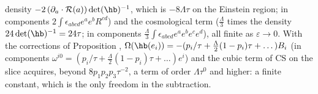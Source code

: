 density $-2\,(\partial_a\cdot\mathcal{R}(a))\det(\hb)^{-1}$, which is $-8\Lambda\tau$ on the Einstein region; in components $2\int\epsilon_{abcd}e^ae^bR^{cd}$) and the cosmological term ($\tfrac{\Lambda}{3}$ times the density $24\det(\hb)^{-1} = 24\tau$; in components $\tfrac{\Lambda}{3}\int\epsilon_{abcd}e^ae^be^ce^d$), all finite as $\varepsilon\to 0$. With the corrections of Proposition , $\Omega(\hb(e_i)) = -(p_i/\tau + \tfrac{\Lambda}{2}(1-p_i)\tau + \dots)B_i$ (in components $\omega^{i0} = (p_i/\tau + \tfrac{\Lambda}{2}(1-p_i)\tau + \dots)e^i$) and the cubic term of $\mathrm{CS}$ on the slice acquires, beyond $8p_1p_2p_3\tau^{-2}$, a term of order $\Lambda\tau^0$ and higher: a finite constant, which is the only freedom in the subtraction.
